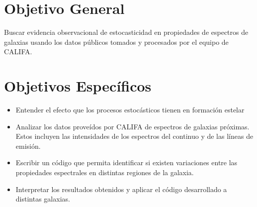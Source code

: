 \documentclass[12pt]{article}
\begin{document}






\section{Objetivo General}

Buscar evidencia observacional de estocasticidad en propiedades de espectros de galaxias usando los datos p\'ublicos tomados y
procesados por el equipo de CALIFA.




\section{Objetivos Espec\'ificos}


\begin{itemize}
	\item Entender el efecto que los procesos estoc\'asticos
          tienen en formaci\'on estelar
	\item Analizar los datos prove\'idos por CALIFA de espectros
          de galaxias pr\'oximas. Estos incluyen las intensidades de los espectros del continuo y de las l\'ineas de emisi\'on.
	\item Escribir un c\'odigo que permita identificar si existen variaciones entre las propiedades espectrales en distintas regiones de la
	galaxia.
	\item Interpretar los resultados obtenidos y aplicar el c\'odigo desarrollado a distintas galaxias.
\end{itemize}
\end{document}

